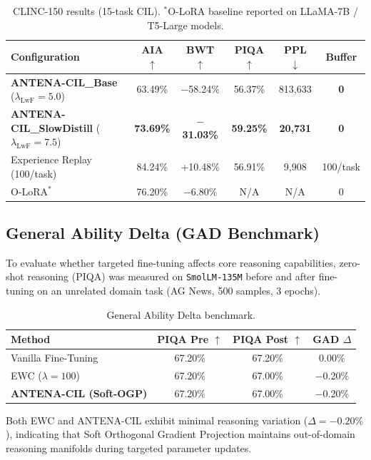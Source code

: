 \documentclass[11pt,a4paper]{article}
\begin{document}
\begin{table}[htbp]
\centering
\caption{CLINC-150 results (15-task CIL). $^*$O-LoRA baseline reported on LLaMA-7B / T5-Large models.}
\label{tab:clinc}
\begin{tabular}{lccccc}
\toprule
Configuration & AIA $\uparrow$ & BWT $\uparrow$ & PIQA $\uparrow$ & PPL $\downarrow$ & Buffer \\
\midrule
\textbf{ANTENA-CIL\_Base} ($\lambda_{\text{LwF}}{=}5.0$) & 63.49\% & $-$58.24\% & 56.37\% & 813,633 & \textbf{0} \\
\textbf{ANTENA-CIL\_SlowDistill} ($\lambda_{\text{LwF}}{=}7.5$) & \textbf{73.69\%} & \textbf{$-$31.03\%} & \textbf{59.25\%} & \textbf{20,731} & \textbf{0} \\
Experience Replay (100/task) & 84.24\% & +10.48\% & 56.91\% & 9,908 & 100/task \\
O-LoRA$^*$ & 76.20\% & $-$6.80\% & N/A & N/A & 0 \\
\bottomrule
\end{tabular}
\end{table}

\subsection{General Ability Delta (GAD Benchmark)}

To evaluate whether targeted fine-tuning affects core reasoning capabilities, zero-shot reasoning (PIQA) was measured on \texttt{SmolLM-135M} before and after fine-tuning on an unrelated domain task (AG News, 500 samples, 3 epochs).

\begin{table}[htbp]
\centering
\caption{General Ability Delta benchmark.}
\label{tab:gad}
\begin{tabular}{lccc}
\toprule
Method & PIQA Pre $\uparrow$ & PIQA Post $\uparrow$ & GAD $\Delta$ \\
\midrule
Vanilla Fine-Tuning & 67.20\% & 67.20\% & 0.00\% \\
EWC ($\lambda{=}100$) & 67.20\% & 67.00\% & $-$0.20\% \\
\textbf{ANTENA-CIL (Soft-OGP)} & 67.20\% & 67.00\% & $-$0.20\% \\
\bottomrule
\end{tabular}
\end{table}

Both EWC and ANTENA-CIL exhibit minimal reasoning variation ($\Delta = -0.20\%$), indicating that Soft Orthogonal Gradient Projection maintains out-of-domain reasoning manifolds during targeted parameter updates.
\end{document}
